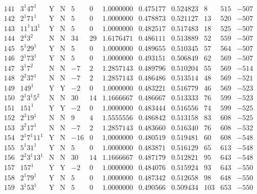 \documentclass[11pt,reqno,a4letter]{article}
\numberwithin{figure}{section}
\numberwithin{table}{section}
\theoremstyle{plain}
\numberwithin{theorem}{section}
\theoremstyle{definition}
\begin{document}
\begin{table}[h!]
\begin{equation*}
{\begin{array}{cc|cc|ccc|cc|ccc}
 141 & 3^1 47^1 & \text{Y} & \text{N} & 5 & 0 & 1.0000000 & 0.475177 & 0.524823 & 8 & 515 & -507 \\
 142 & 2^1 71^1 & \text{Y} & \text{N} & 5 & 0 & 1.0000000 & 0.478873 & 0.521127 & 13 & 520 & -507 \\
 143 & 11^1 13^1 & \text{Y} & \text{N} & 5 & 0 & 1.0000000 & 0.482517 & 0.517483 & 18 & 525 & -507 \\
 144 & 2^4 3^2 & \text{N} & \text{N} & 34 & 29 & 1.6176471 & 0.486111 & 0.513889 & 52 & 559 & -507 \\
 145 & 5^1 29^1 & \text{Y} & \text{N} & 5 & 0 & 1.0000000 & 0.489655 & 0.510345 & 57 & 564 & -507 \\
 146 & 2^1 73^1 & \text{Y} & \text{N} & 5 & 0 & 1.0000000 & 0.493151 & 0.506849 & 62 & 569 & -507 \\
 147 & 3^1 7^2 & \text{N} & \text{N} & -7 & 2 & 1.2857143 & 0.489796 & 0.510204 & 55 & 569 & -514 \\
 148 & 2^2 37^1 & \text{N} & \text{N} & -7 & 2 & 1.2857143 & 0.486486 & 0.513514 & 48 & 569 & -521 \\
 149 & 149^1 & \text{Y} & \text{Y} & -2 & 0 & 1.0000000 & 0.483221 & 0.516779 & 46 & 569 & -523 \\
 150 & 2^1 3^1 5^2 & \text{N} & \text{N} & 30 & 14 & 1.1666667 & 0.486667 & 0.513333 & 76 & 599 & -523 \\
 151 & 151^1 & \text{Y} & \text{Y} & -2 & 0 & 1.0000000 & 0.483444 & 0.516556 & 74 & 599 & -525 \\
 152 & 2^3 19^1 & \text{N} & \text{N} & 9 & 4 & 1.5555556 & 0.486842 & 0.513158 & 83 & 608 & -525 \\
 153 & 3^2 17^1 & \text{N} & \text{N} & -7 & 2 & 1.2857143 & 0.483660 & 0.516340 & 76 & 608 & -532 \\
 154 & 2^1 7^1 11^1 & \text{Y} & \text{N} & -16 & 0 & 1.0000000 & 0.480519 & 0.519481 & 60 & 608 & -548 \\
 155 & 5^1 31^1 & \text{Y} & \text{N} & 5 & 0 & 1.0000000 & 0.483871 & 0.516129 & 65 & 613 & -548 \\
 156 & 2^2 3^1 13^1 & \text{N} & \text{N} & 30 & 14 & 1.1666667 & 0.487179 & 0.512821 & 95 & 643 & -548 \\
 157 & 157^1 & \text{Y} & \text{Y} & -2 & 0 & 1.0000000 & 0.484076 & 0.515924 & 93 & 643 & -550 \\
 158 & 2^1 79^1 & \text{Y} & \text{N} & 5 & 0 & 1.0000000 & 0.487342 & 0.512658 & 98 & 648 & -550 \\
 159 & 3^1 53^1 & \text{Y} & \text{N} & 5 & 0 & 1.0000000 & 0.490566 & 0.509434 & 103 & 653 & -550 \\

\end{array}}
\end{equation*}
\end{table}
\end{document}
